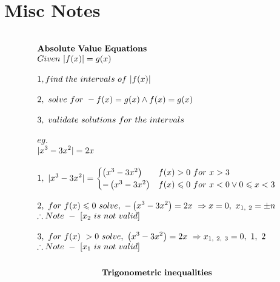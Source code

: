 \documentclass{article}
\begin{document}
\newpage 

\section{Misc Notes}


\setlength{\columnsep}{6cm}
\begin{multicols}{2}
    \noindent 
    \[
        \begin{array}{>{\displaystyle}l}
        \\
        \mathbf{Absolute\ Value\ Equations\ }\\

        Given\ |f( x) |=g( x)\\
        \\
        1,find\ the\ intervals\ of\ |f( x)|\\
        \\
        2,\ solve\ for\ -f( x) =g( x) \land f( x) =g( x) \\
        \\
        3,\ validate\ solutions\ for\ the\ intervals\\
        \\
        eg.\ \\
        |x^{3} -3x^{2} |=2x\\
        \\
        1,\ |x^{3} -3x^{2} |=\begin{cases}
        \left( x^{3} -3x^{2}\right) & f( x)  >0\ for\ x >3\\
        -\left( x^{3} -3x^{2}\right) & f( x) \leqslant 0\ for\ x< 0\lor 0\leqslant x< 3
        \end{cases}\\
        \\
        2,\ for\ f( x) \leqslant 0\ solve,\ -\left( x^{3} -3x^{2}\right) =2x\ \Rightarrow x =0,\ x_{1,\ 2} =\pm n \\
        \therefore Note\ -\ [ x_{2} \ is\ not\ valid]\\
        \\
        3,\ for\ f( x) \  >0\ solve,\ \left( x^{3} -3x^{2}\right) =2x\ \Rightarrow x_{1,\ 2,\ 3} =0,\ 1,\ 2\ \\
        \therefore Note\ -\ [ x_{1} \ is\ not\ valid]\\
        \\
    \end{array}    
    \]
    \columnbreak
    \noindent 
    \[
    \begin{array}{>{\displaystyle}l}
    \mathbf{Trigonometric\ inequalities}\\

\end{array}\]
\end{multicols}
\end{document}

